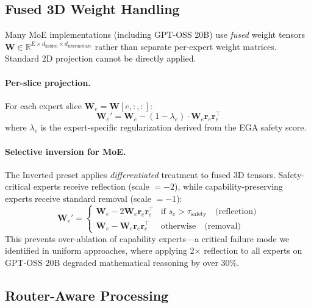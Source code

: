 \documentclass[11pt]{article}
\begin{document}
\subsection{Fused 3D Weight Handling}
\label{sec:fused3d}

Many MoE implementations (including GPT-OSS 20B) use \emph{fused} weight tensors $\mathbf{W} \in \mathbb{R}^{E \times d_{\text{hidden}} \times d_{\text{intermediate}}}$ rather than separate per-expert weight matrices. Standard 2D projection cannot be directly applied.

\paragraph{Per-slice projection.}
For each expert slice $\mathbf{W}_e = \mathbf{W}[e, :, :]$:
\begin{equation}
    \mathbf{W}_e' = \mathbf{W}_e - (1-\lambda_e) \cdot \mathbf{W}_e \mathbf{r}_e \mathbf{r}_e^\top
\end{equation}
where $\lambda_e$ is the expert-specific regularization derived from the EGA safety score.

\paragraph{Selective inversion for MoE.}
The Inverted preset applies \emph{differentiated} treatment to fused 3D tensors. Safety-critical experts receive reflection (scale $= -2$), while capability-preserving experts receive standard removal (scale $= -1$):
\begin{equation}
    \mathbf{W}_e' = \begin{cases}
        \mathbf{W}_e - 2\mathbf{W}_e\mathbf{r}_e\mathbf{r}_e^\top & \text{if } s_e > \tau_{\text{safety}} \quad \text{(reflection)} \\
        \mathbf{W}_e - \mathbf{W}_e\mathbf{r}_e\mathbf{r}_e^\top & \text{otherwise} \quad \text{(removal)}
    \end{cases}
\end{equation}
This prevents over-ablation of capability experts---a critical failure mode we identified in uniform approaches, where applying 2$\times$ reflection to all experts on GPT-OSS 20B degraded mathematical reasoning by over 30\%.

\subsection{Router-Aware Processing}
\label{sec:router_analysis}
\end{document}
